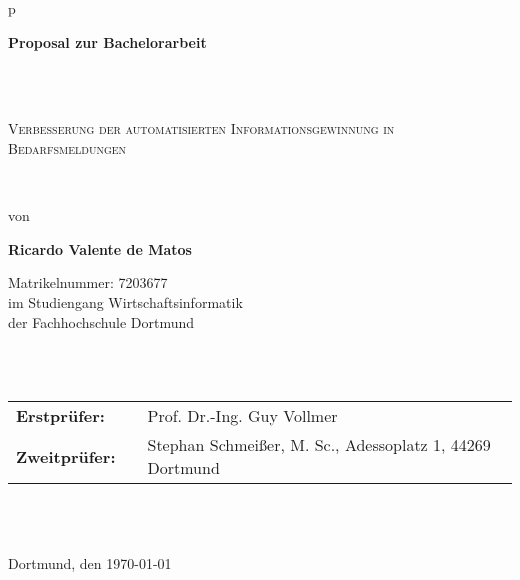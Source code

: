\begin{center}
	\begin{tabular}{p{\textwidth}}
		
		\begin{center}
			\textbf{\Large{Proposal zur Bachelorarbeit}}
		\end{center} \\ \\
		
		\begin{center}
			\LARGE{\textsc{
					Verbesserung der automatisierten Informationsgewinnung in Bedarfsmeldungen
			}}
		\end{center}
		
		\\
		
		
		
		\begin{center}
			von
		\end{center}
		
		\begin{center}
			\large{\textbf{Ricardo Valente de Matos}}
		\end{center}
	
	\begin{center}
		\large{Matrikelnummer: 7203677} \\
		\large{im Studiengang Wirtschaftsinformatik \\
			der Fachhochschule Dortmund \\}
	\end{center}
		
		
		\\
		
		\\
		
		\begin{center}
			\begin{tabular}{lll}
				\textbf{Erstprüfer:} & & Prof. Dr.-Ing. Guy Vollmer\\
				\textbf{Zweitprüfer:} & & Stephan Schmeißer, M. Sc., Adessoplatz 1, 44269 Dortmund\\
			\end{tabular}
		\end{center}
	
	\\ \\
	
	\begin{center}
		\large{Dortmund, den \today}
	\end{center}
		
	\end{tabular}
\end{center}
